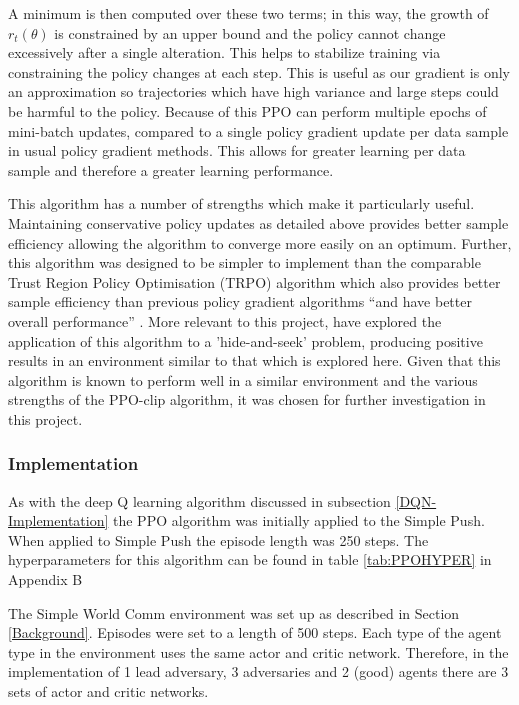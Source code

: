 \documentclass{article}
\begin{document}
A minimum is then computed over these two terms; in this way, the growth of $r_t(\theta)$ is constrained by an upper bound and the policy cannot change excessively after a single alteration.
This helps to stabilize training via constraining the policy changes at each step. This is useful as our gradient is only an approximation so trajectories which have high variance and large steps could be harmful to the policy.
Because of this PPO can perform multiple epochs of mini-batch updates, compared to a single policy gradient update per data sample in usual policy gradient methods.
This allows for greater learning per data sample and therefore a greater learning performance.

This algorithm has a number of strengths which make it particularly useful.
Maintaining conservative policy updates as detailed above provides better sample efficiency allowing the algorithm to converge more easily on an optimum.
Further, this algorithm was designed to be simpler to implement than the comparable Trust Region Policy Optimisation (TRPO) algorithm \citet{trustregionpolicy} which also provides better sample efficiency than previous policy gradient algorithms “and have better overall performance” \citet{PPOAlgo}.
More relevant to this project, \citet{emergenttoolusage} have explored the application of this algorithm to a 'hide-and-seek' problem, producing positive results in an environment similar to that which is explored here.
Given that this algorithm is known to perform well in a similar environment and the various strengths of the PPO-clip algorithm, it was chosen for further investigation in this project.

\subsubsection{Implementation} \label{A2C-Implementation}

As with the deep Q learning algorithm discussed in subsection \ref{DQN-Implementation} the PPO algorithm was initially applied to the Simple Push.
When applied to Simple Push the episode length was 250 steps.
The hyperparameters for this algorithm can be found in table \ref{tab:PPOHYPER} in Appendix B

The Simple World Comm environment was set up as described in Section \ref{Background}.
Episodes were set to a length of 500 steps.
Each type of the agent type in the environment uses the same actor and critic network.
Therefore, in the implementation of 1 lead adversary, 3 adversaries and 2 (good) agents there are 3 sets of actor and critic networks.
\end{document}
